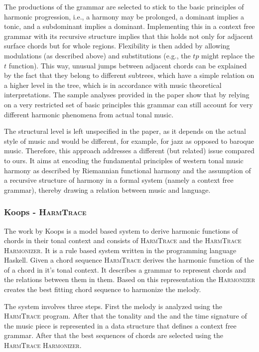 The productions of the grammar are selected to stick to the basic principles of harmonic progression, i.e., a harmony may be prolonged, a dominant implies a tonic, and a subdominant implies a dominant.
Implementing this in a context free grammar with its recursive structure implies that this holds not only for adjacent surface chords but for whole regions.
Flexibility is then added by allowing modulations (as described above) and substitutions (e.g., the $tp$ might replace the $t$ function).
This way, unusual jumps between adjacent chords can be explained by the fact that they belong to different subtrees, which have a simple relation on a higher level in the tree, which is in accordance with music theoretical interpretations.
The sample analyses provided in the paper show that by relying on a very restricted set of basic principles this grammar can still account for very different harmonic phenomena from actual tonal music.

The structural level is left unspecified in the paper, as it depends on the actual style of music and would be different, for example, for jazz as opposed to baroque music.
Therefore, this approach addresses a different (but related) issue compared to ours.
It aims at encoding the fundamental principles of western tonal music harmony as described by Riemannian functional harmony and the assumption of a recursive structure of harmony in a formal system (namely a context free grammar), thereby drawing a relation between music and language.

\subsubsection{Koops - \textsc{HarmTrace}}
The work by Koops \autocite{koops2012model} is a model based system to derive harmonic functions of chords in their tonal context and consists of \textsc{HarmTrace} and the \textsc{HarmTrace Harmonizer}. It is a rule based system written in the programming language Haskell. Given a chord sequence \textsc{HarmTrace} derives the harmonic function of the of a chord in it's tonal context. It describes a grammar to represent chords and the relations between them in them. Based on this representation the \textsc{Harmonizer} creates the best fitting chord sequence to harmonize the melody.

The system involves three steps. First the melody is analyzed using the \textsc{HarmTrace} program. After that the tonality and the and the time signature of the music piece is represented in a data structure that defines a context free grammar. After that the best sequences of chords are selected using the \textsc{HarmTrace Harmonizer}. 


